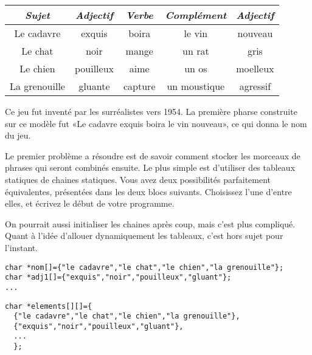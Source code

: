 \documentclass[10pt]{article}\usepackage[enonce]{exemptty}
\begin{document}
\medskip\noindent\begin{minipage}{.6\linewidth}
  \begin{tabular}{|c|c|c|c|c|}\hline
    \textit{Sujet}&\textit{Adjectif}&\textit{Verbe}&\textit{Complément}&\textit{Adjectif}
    \\\hline
    Le cadavre&exquis&boira&le vin&nouveau\\\hline
    Le chat&noir&mange&un rat&gris\\\hline
    Le chien&pouilleux&aime&un os&moelleux\\\hline
    La grenouille&gluante&capture&un moustique&agressif\\\hline  
  \end{tabular}
\end{minipage}\hfill\begin{minipage}{.35\linewidth}
  Ce jeu fut inventé par les surréalistes vers 1954. La première
  pharse construite sur ce modèle fut «Le cadavre exquis boira le vin nouveau»,
  ce qui donna le nom du jeu.
\end{minipage}

\Question Le premier problème a résoudre est de savoir comment stocker
les morceaux de phrases qui seront combinés ensuite. Le plus simple
est d'utiliser des tableaux statiques de chaines statiques. Vous avez
deux possibilités parfaitement équivalentes, présentées dans les deux
blocs suivants. Choisissez l'une d'entre elles, et écrivez le début de
votre programme.

\begin{Reponse}
  On pourrait aussi initialiser les chaines après coup, mais c'est plus
  compliqué. Quant à l'idée d'allouer dynamiquement les tableaux, c'est hors
  sujet pour l'instant.
\end{Reponse}

\begin{Verbatim}[label=Première approche pour le stockage des données]
char *nom[]={"le cadavre","le chat","le chien","la grenouille"};
char *adj1[]={"exquis","noir","pouilleux","gluant"};
...  
\end{Verbatim}

\begin{Verbatim}[label=Deuxieme approche pour le stockage des données]
char *elements[][]={
  {"le cadavre","le chat","le chien","la grenouille"},
  {"exquis","noir","pouilleux","gluant"},
  ...
  };
\end{Verbatim}
\end{document}
